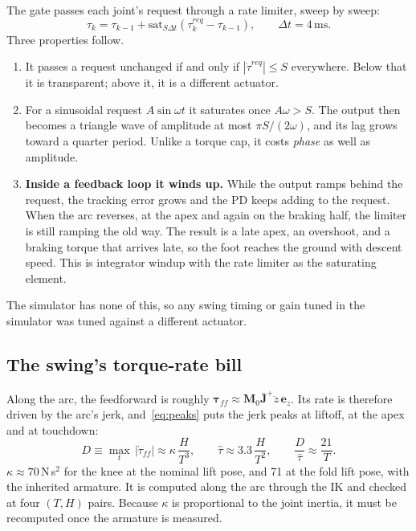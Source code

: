 \documentclass[11pt,a4paper]{article}
\newcommand{\Jbar}{\bar{\mathbf{J}}}
\newcommand{\Mmat}{\mathbf{M}}
\newcommand{\vtau}{\boldsymbol{\tau}}
\newcommand{\ez}{\mathbf{e}_z}
\begin{document}
The gate passes each joint's request through a rate limiter, sweep by sweep:
\begin{equation}
\tau_k = \tau_{k-1} + \mathrm{sat}_{S\Delta t}\!\left(\tau_k^{req} - \tau_{k-1}\right), \qquad \Delta t = 4\,\text{ms}.
\label{eq:slew}
\end{equation}
Three properties follow.
\begin{enumerate}[leftmargin=1.5em]
\item It passes a request unchanged if and only if $|\dot\tau^{req}| \le S$
everywhere. Below that it is transparent; above it, it is a different
actuator.
\item For a sinusoidal request $A\sin\omega t$ it saturates once
$A\omega > S$. The output then becomes a triangle wave of amplitude at most
$\pi S/(2\omega)$, and its lag grows toward a quarter period. Unlike a
torque cap, it costs \emph{phase} as well as amplitude.
\item \textbf{Inside a feedback loop it winds up.} While the output ramps
behind the request, the tracking error grows and the PD keeps adding to the
request. When the arc reverses, at the apex and again on the braking half,
the limiter is still ramping the old way. The result is a late apex, an
overshoot, and a braking torque that arrives late, so the foot reaches the
ground with descent speed. This is integrator windup with the rate limiter as
the saturating element.
\end{enumerate}
The simulator has none of this, so any swing timing or gain tuned in the
simulator was tuned against a different actuator.

\subsection{The swing's torque-rate bill}
\label{sec:budget}

Along the arc, the feedforward is roughly
$\vtau_{ff} \approx \Mmat_0\Jbar^+\ddot z\,\ez$. Its rate is therefore driven
by the arc's jerk, and~\eqref{eq:peaks} puts the jerk peaks at liftoff, at
the apex and at touchdown:
\begin{equation}
D \equiv \max_t\,|\dot\tau_{ff}| \approx \kappa\,\frac{H}{T^3}, \qquad
\hat\tau \approx 3.3\,\frac{H}{T^2}, \qquad
\frac{D}{\hat\tau} \approx \frac{21}{T}.
\label{eq:budget}
\end{equation}
$\kappa \approx 70$\,N\,s$^2$ for the knee at the nominal lift pose, and 71 at
the fold lift pose, with the inherited armature. It is computed along the arc
through the IK and checked at four $(T,H)$ pairs. Because $\kappa$ is
proportional to the joint inertia, it must be recomputed once the armature is
measured.
\end{document}

